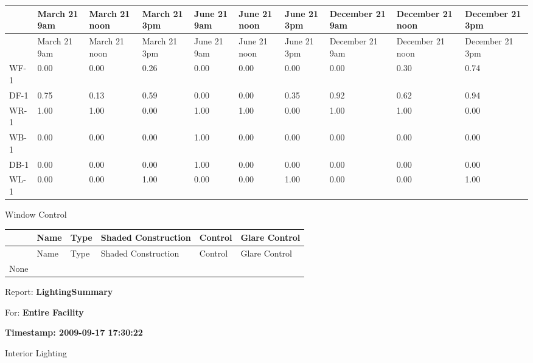 {\scriptsize
\begin{longtable}[c]{>{\raggedright}p{0.6in}>{\raggedright}p{0.5in}>{\raggedright}p{0.5in}>{\raggedright}p{0.5in}>{\raggedright}p{0.5in}>{\raggedright}p{0.5in}>{\raggedright}p{0.5in}>{\raggedright}p{0.5in}>{\raggedright}p{0.5in}>{\raggedright}p{0.5in}}
\toprule 
~ & March 21 9am & March 21 noon & March 21 3pm & June 21 9am & June 21 noon & June 21 3pm & December 21 9am & December 21 noon & December 21 3pm \tabularnewline
\midrule
\endfirsthead

\toprule 
~ & March 21 9am & March 21 noon & March 21 3pm & June 21 9am & June 21 noon & June 21 3pm & December 21 9am & December 21 noon & December 21 3pm \tabularnewline
\midrule
\endhead

WF-1 & 0.00 & 0.00 & 0.26 & 0.00 & 0.00 & 0.00 & 0.00 & 0.30 & 0.74 \tabularnewline
DF-1 & 0.75 & 0.13 & 0.59 & 0.00 & 0.00 & 0.35 & 0.92 & 0.62 & 0.94 \tabularnewline
WR-1 & 1.00 & 1.00 & 0.00 & 1.00 & 1.00 & 0.00 & 1.00 & 1.00 & 0.00 \tabularnewline
WB-1 & 0.00 & 0.00 & 0.00 & 1.00 & 0.00 & 0.00 & 0.00 & 0.00 & 0.00 \tabularnewline
DB-1 & 0.00 & 0.00 & 0.00 & 1.00 & 0.00 & 0.00 & 0.00 & 0.00 & 0.00 \tabularnewline
WL-1 & 0.00 & 0.00 & 1.00 & 0.00 & 0.00 & 1.00 & 0.00 & 0.00 & 1.00 \tabularnewline
\bottomrule
\end{longtable}}

Window Control

\begin{longtable}[c]{@{}llllll@{}}
\toprule 
~ & Name & Type & Shaded Construction & Control & Glare Control \tabularnewline
\midrule
\endfirsthead

\toprule 
~ & Name & Type & Shaded Construction & Control & Glare Control \tabularnewline
\midrule
\endhead

None & ~ & ~ & ~ & ~ & ~ \tabularnewline
\bottomrule
\end{longtable}

Report: \textbf{LightingSummary}

For: \textbf{Entire Facility}

\textbf{Timestamp: 2009-09-17 17:30:22}

Interior Lighting

